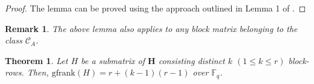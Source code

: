 \documentclass[conference]{IEEEtran}
\newtheorem{theorem}{Theorem}
\newtheorem{remark}{Remark}
\begin{document}
\begin{proof} The lemma can be proved using the approach outlined in Lemma 1 of \cite{kumar2024entanglement}.
\end{proof}
\begin{remark}\label{re1}
	The above lemma also applies to any block matrix belonging to the class $\mathcal{C}_{A}$.
\end{remark}
\begin{theorem}\label{theorem1}
	Let $H$ be a submatrix of $\mathbf{H}$ consisting distinct $k$ $(1\leq k\leq r)$ block-rows. Then, $\mathrm{gfrank}(H)=r+(k-1)(r-1)$ over $\mathbb{F}_{q}$.
\end{theorem}
\end{document}

